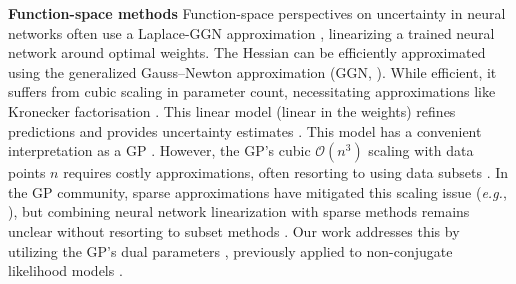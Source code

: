 \documentclass{article}
\makeatletter
\newcommand{\eg}{\textit{e.g.\@}\xspace}
\makeatother
\begin{document}
\textbf{Function-space methods}
Function-space perspectives on uncertainty in neural networks often use a Laplace-GGN approximation \citep{daxberger2021laplace}, linearizing a trained neural network around optimal weights. The Hessian can be efficiently approximated using the generalized Gauss--Newton approximation (GGN, \cite{botev2017practical}). While efficient, it suffers from cubic scaling in parameter count, necessitating approximations like Kronecker factorisation \cite{martens2015optimizing, ritter2018kfac}.  This linear model (linear in the weights) refines predictions and provides uncertainty estimates \citep{immer2021scalable}. This model has a convenient interpretation as a GP \cite{immer2021scalable, khan2019approximate, maddox2021fast}.
%
However, the GP's cubic $\mathcal{O}(n^3)$ scaling with data points $n$ requires costly approximations, often resorting to using data subsets \cite{immer2021scalable}. In the GP community, sparse approximations have mitigated this scaling issue (\eg, \cite{titsias2009variational,hensman2013gaussian}), but combining neural network linearization with sparse methods remains  unclear without resorting to subset methods . Our work addresses this by utilizing the GP's dual parameters \cite{csato2002sparse}, previously applied to non-conjugate likelihood models \cite{adam2021dual}.

%
\end{document}
